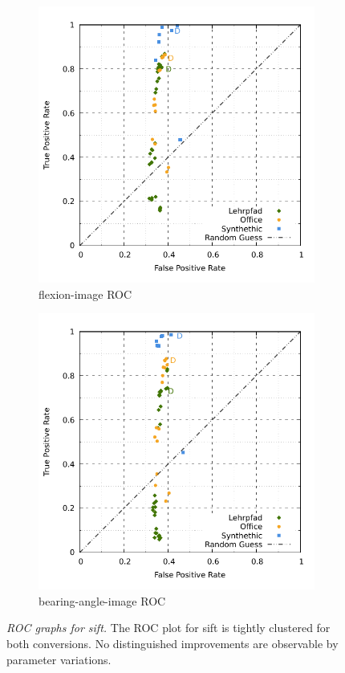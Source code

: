 \begin{figure}[H]
\begin{subfigure}[t]{0.45\linewidth}
    \includegraphics[width=\linewidth]{chapter06/results/SIFT/flexion/roc.pdf}%
    \caption{\gls{flexion-image} \acrshort{ROC}}
\end{subfigure}\quad
\begin{subfigure}[t]{0.45\linewidth}
    \includegraphics[width=\linewidth]{chapter06/results/SIFT/bearing/roc.pdf}
    \caption{\gls{bearing-angle-image} \acrshort{ROC}}
\end{subfigure}
\caption[\acrshort{ROC} graphs for \acrshort{sift}]{\emph{\acrshort{ROC} graphs for \acrshort{sift}.} The \acrshort{ROC} plot for \acrshort{sift} is tightly clustered for both conversions. No distinguished improvements are observable by parameter variations.}\label{fig:roc_sift}
\end{figure}
